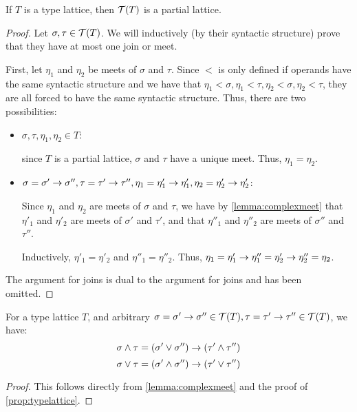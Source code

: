 \documentclass[main.tex]{subfiles}
\begin{document}
\begin{prop}
    \label{prop:typelattice}
    If $T$ is a type lattice, then $\mathcal{T}( T )$ is a partial lattice.
\end{prop}
\begin{proof}
    Let $\sigma, \tau \in \mathcal{T}( T )$. We will inductively (by their syntactic
    structure) prove that they have at most one join or meet.
    
    First, let $\eta_1$ and $\eta_2$ be meets of $\sigma$ and $\tau$.
    Since $\less$ is only defined if operands have the same syntactic structure
    and we have that $\eta_1 \less \sigma, \eta_1 \less \tau, \eta_2 \less \sigma, \eta_2 \less \tau$,
    they are all forced to have the same syntactic structure. Thus, there are
    two possibilities:
    
    \begin{itemize}
        \item $\sigma, \tau, \eta_1, \eta_2 \in T$: 
            
            since $T$ is a partial
            lattice, $\sigma$ and $\tau$ have a unique meet. Thus, $\eta_1 = \eta_2$.
        \item $\sigma = \sigma' \rightarrow \sigma'', \tau = \tau' \rightarrow \tau'',
            \eta_1 = \eta'_1 \rightarrow \eta'_1, \eta_2 = \eta'_2 \rightarrow \eta'_2$:
           
            Since $\eta_1$ and $\eta_2$ are meets of $\sigma$ and $\tau$, we have
            by \cref{lemma:complexmeet} that $\eta'_1$ and $\eta'_2$ are meets
            of $\sigma'$ and $\tau'$, and that $\eta''_1$ and $\eta''_2$ are meets
            of $\sigma''$ and $\tau''$.
            
            Inductively, $\eta'_1 = \eta'_2$ and $\eta''_1 = \eta''_2$. Thus,
            $\eta_1 = \eta'_1 \rightarrow \eta''_1 = \eta'_2 \rightarrow \eta''_2 = \eta_2$.
    \end{itemize}

    The argument for joins is dual to the argument for joins and has been
    omitted.
\end{proof}

\begin{property}
    For a type lattice $T$, and arbitrary $\sigma = \sigma' \rightarrow \sigma'' \in \mathcal{T}( T )
    , \tau = \tau' \rightarrow \tau'' \in \mathcal{T}( T )$, we have:
    \[
        \sigma \wedge \tau = (\sigma' \vee \sigma'') \rightarrow (\tau' \wedge \tau'')
    \]
    \[
        \sigma \vee \tau = (\sigma' \wedge \sigma'') \rightarrow (\tau' \vee \tau'')
    \]
\end{property}
\begin{proof}
    This follows directly from \cref{lemma:complexmeet} and the proof of
    \cref{prop:typelattice}.
\end{proof}
\end{document}
